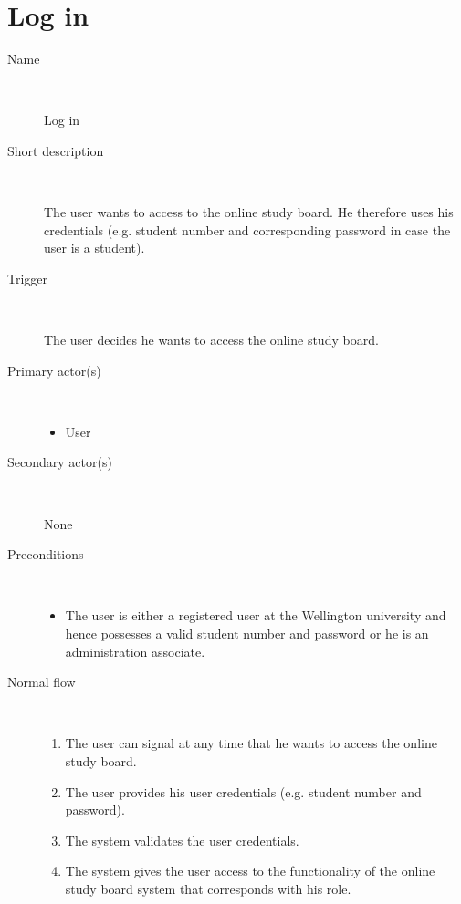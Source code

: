 \section{Log in}

\begin{description}
	\item[Name] \
		\par Log in
	\item[Short description] \ 
			\par The user wants to access to the online study board. He therefore uses
			his credentials (e.g. student number and corresponding password in case
			the user is a student). 
	\item[Trigger] \ 
			\par The user decides he wants to access the online study board.
	\item[Primary actor(s)] \ 
		\begin{itemize}
		  \item User
		\end{itemize}
	\item[Secondary actor(s)] \ 
		\par None
	\item[Preconditions] \ 
	\begin{itemize}
		\item The user is either a registered user at the Wellington university and
		hence possesses a valid student number and password or he is an administration
		associate.
	\end{itemize}
	\item[Normal flow] \ 
	\begin{enumerate}
	  	\item The user can signal at any time that he wants to access the online
	  	study board.
	  	\item The user provides his user credentials (e.g. student number and
	  	password).
	  	\item The system validates the user credentials.
	  	\item The system gives the user access to the functionality of the online
	  	study board system that corresponds with his role.


\end{enumerate}
\end{description}
